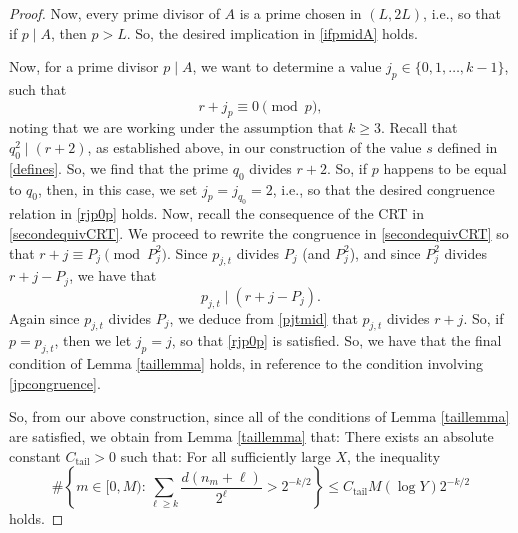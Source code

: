 \documentclass[12pt]{article}
\begin{document}
\begin{proof}
 Now, every prime divisor of $A$ is a prime chosen in $(L, 2L)$, i.e., so that if $p \mid A$, then $p > L$. So, the desired implication 
 in \eqref{ifpmidA} holds. 

 Now, for a prime divisor $p \mid A$, we want to determine a value
 $ j_p \in \{ 0, 1, \ldots, k - 1 \}$, 
 such that 
\begin{equation}\label{rjp0p} 
 r + j_p \equiv 0 \pmod p, 
\end{equation}
 noting that we are working under the assumption that $k \geq 3$. Recall that $q_0^2 \mid (r+2)$, as established above, in our 
 construction of the value $s$ defined in \eqref{defines}. So, we find that the prime $q_0$ divides $r+2$. So, if $p$ happens to be equal 
 to $q_0$, then, in this case, we set $j_p = j_{q_0} = 2$, i.e., so that the desired congruence relation in \eqref{rjp0p} holds. Now, recall the 
 consequence of the CRT in \eqref{secondequivCRT}. We proceed to rewrite the congruence in \eqref{secondequivCRT} so that $ r + j 
 \equiv P_j \pmod {P_{j}^{2}}$. Since $p_{j, t}$ divides $P_j$ (and $P_j^2$), and since ${P_{j}^{2}}$ divides $ r + j - P_j$, we have that 
\begin{equation}\label{pjtmid} 
 p_{j, t} \mid (r + j - P_j).
\end{equation} 
 Again since $p_{j, t}$ divides $P_j$, we deduce from \eqref{pjtmid} that $p_{j, t}$ divides $r + j$. So, if $p = p_{j, t}$, then we let $j_p = 
 j$, so that \eqref{rjp0p} is satisfied. 
 So, we have that the final condition of Lemma \ref{taillemma} holds, in reference
 to the condition involving \eqref{jpcongruence}. 

 So, from our above construction, since all of the conditions of Lemma \ref{taillemma} are satisfied, we obtain from Lemma 
 \ref{taillemma} that: There exists an absolute constant $C_{\operatorname{tail}} > 0$ such that: For all sufficiently large $X$, 
 the inequality 
\begin{equation}\label{bigenumerate} 
 \#\left\{ m \in [0, M) : \sum_{\ell \geq k} \frac{d(n_m + \ell)}{2^\ell} > 2^{-k/2} \right\} 
 \leq C_{\operatorname{tail}} M (\log Y) 2^{-k/2} 
\end{equation}
 holds. 


\end{proof}
\end{document}
